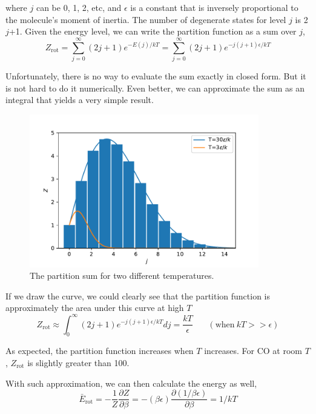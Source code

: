 where $j$ can be 0, 1, 2, etc, and $\epsilon$ is a constant that is inversely proportional to the molecule's moment of inertia.
The number of degenerate states for level $j$ is 2$j$+1. Given the energy level, we can write the partition function as a sum over $j$,
\begin{equation}
Z_\text{rot} = \sum_{j=0}^{\infty} (2j+1)e^{-E(j)/kT} = \sum_{j=0}^{\infty}(2j+1) e^{-j(j+1) \epsilon /kT}
\end{equation}
 
Unfortunately, there is no way to evaluate the sum exactly in closed form. But it is not hard to do it numerically. Even better,
we can approximate the sum as an integral that yields a very simple result.

\begin{figure}[h]
\centering
\includegraphics[width=10cm]{imgs/Rotation}
\caption{The partition sum for two different temperatures. }
\end{figure}

If we draw the curve, we could clearly see that the partition function is approximately the area under this curve at high $T$
\begin{equation}
Z_\text{rot} \approx \int_{0}^{\infty}(2j+1) e^{-j(j+1) \epsilon /kT} dj = \frac{kT}{\epsilon}  ~~~~~~~~(\text{when} ~kT >> \epsilon)
\end{equation}
 
As expected, the partition function increases when $T$ increases. For CO at room $T$, $Z_\text{rot}$ is slightly greater than 100.

With such approximation, we can then calculate the energy as well,
\begin{equation}
\bar{E}_\text{rot} = -\frac{1}{Z} \frac{\partial Z}{\partial {\beta}} 
                   = -(\beta\epsilon) \frac{\partial(1/\beta\epsilon)}{\partial{\beta}}=1/kT
\end{equation}
 
